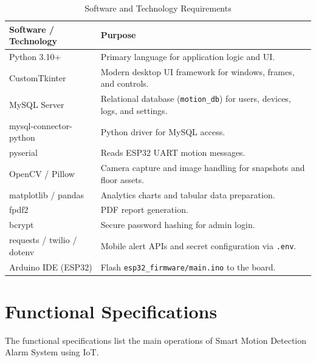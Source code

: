 \documentclass[12pt,a4paper]{report}
\begin{document}
\begin{table}[htbp]
\centering
\label{tab:software_requirements}
\begin{tabular}{|p{4cm}|p{8cm}|}
\hline
\textbf{Software / Technology} & \textbf{Purpose} \\ \hline
Python 3.10+ & Primary language for application logic and UI. \\ \hline
CustomTkinter & Modern desktop UI framework for windows, frames, and controls. \\ \hline
MySQL Server & Relational database (\texttt{motion\_db}) for users, devices, logs, and settings. \\ \hline
mysql-connector-python & Python driver for MySQL access. \\ \hline
pyserial & Reads ESP32 UART motion messages. \\ \hline
OpenCV / Pillow & Camera capture and image handling for snapshots and floor assets. \\ \hline
matplotlib / pandas & Analytics charts and tabular data preparation. \\ \hline
fpdf2 & PDF report generation. \\ \hline
bcrypt & Secure password hashing for admin login. \\ \hline
requests / twilio / dotenv & Mobile alert APIs and secret configuration via \texttt{.env}. \\ \hline
Arduino IDE (ESP32) & Flash \texttt{esp32\_firmware/main.ino} to the board. \\ \hline
\end{tabular}
\caption{Software and Technology Requirements}
\end{table}

\section{Functional Specifications}

The functional specifications list the main operations of Smart Motion Detection Alarm System using IoT.
\end{document}
